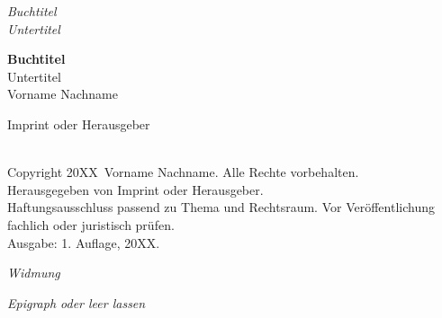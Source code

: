 \providecommand{\BookTitle}{Buchtitel}
\providecommand{\BookSubtitle}{Untertitel}
\providecommand{\BookAuthor}{Vorname Nachname}
\providecommand{\BookImprint}{Imprint oder Herausgeber}
\providecommand{\BookYear}{20XX}
\providecommand{\BookDisclaimer}{Haftungsausschluss passend zu Thema und Rechtsraum. Vor Veröffentlichung fachlich oder juristisch prüfen.}
\providecommand{\BookDedication}{Widmung}
\providecommand{\BookEpigraph}{Epigraph oder leer lassen}

\frontmatter
\thispagestyle{empty}
\vspace*{2.6in}
\begin{center}
  {\LARGE\itshape \BookTitle}\\[0.45em]
  {\large\itshape \BookSubtitle}
\end{center}
\clearpage

\thispagestyle{empty}
\vspace*{1.5in}
\begin{center}
  {\sffamily\bfseries\fontsize{34}{38}\selectfont\color{ink} \BookTitle}\\[0.5em]
  {\sffamily\fontsize{18}{22}\selectfont\color{ink} \BookSubtitle}\\[3.2em]
  {\Large\color{ink} \BookAuthor}
\end{center}
\vfill
\begin{center}{\small\color{muted} \BookImprint}\end{center}
\clearpage

\thispagestyle{empty}
\vspace*{\fill}
\noindent {\itshape \BookTitle}\\[0.4em]
Copyright \textcopyright{} \BookYear\ \BookAuthor. Alle Rechte vorbehalten.\\[0.6em]
Herausgegeben von \BookImprint.\\[1em]
{\small \BookDisclaimer\\[0.5em] Ausgabe: 1. Auflage, \BookYear.}
\clearpage

\thispagestyle{empty}
\vspace*{3.2in}
\begin{center}\itshape \BookDedication\end{center}
\clearpage

\thispagestyle{empty}
\vspace*{3.2in}
\begin{center}\itshape\color{ink!85} \BookEpigraph\end{center}
\clearpage

\begingroup
\renewcommand{\contentsname}{Inhalt}
\setcounter{tocdepth}{0}
\tableofcontents
\endgroup
\clearpage
\mainmatter
